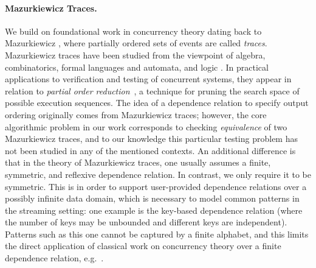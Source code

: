 \paragraph{Mazurkiewicz Traces.}
We build on foundational work in concurrency theory dating back to Mazurkiewicz \cite{mazurkiewicz1986trace}, where partially ordered sets of events are called \emph{traces}. Mazurkiewicz traces have been studied from the
viewpoint of algebra, combinatorics, formal languages and automata, and
logic \cite{DiekertR1995}. In practical applications to verification and
testing of concurrent systems, they appear in relation to
\emph{partial order reduction}~\cite{God96,Peled94}, a technique for
pruning the search space of possible execution sequences.
The idea of a dependence relation to specify output ordering originally comes from Mazurkiewicz traces; however, the core algorithmic problem in our work corresponds to checking \emph{equivalence} of two Mazurkiewicz traces, and to our knowledge this particular testing problem has not been studied in any of the mentioned contexts.
An additional difference is that in the theory of Mazurkiewicz traces, one usually assumes a finite, symmetric, and reflexive dependence relation. In contrast, we only require it to be symmetric. This is in order to support user-provided dependence relations over a possibly infinite data domain, which is necessary to model common patterns in the streaming setting: one example is the key-based dependence relation (where the number of keys may be unbounded and different keys are independent). Patterns such as this one cannot be captured by a finite alphabet, and this limits the direct application of classical work on concurrency theory over a finite dependence relation, e.g.~\cite{DiekertR1995}.

